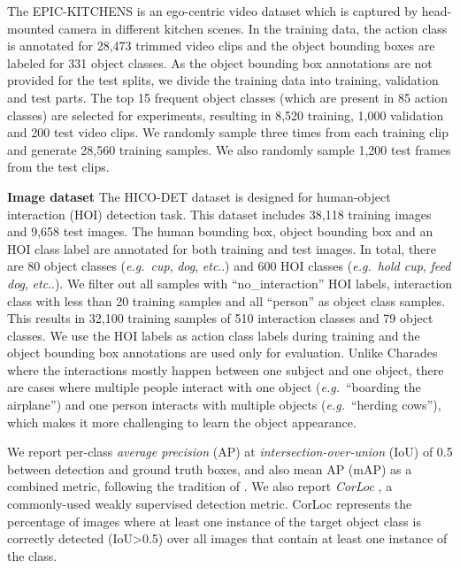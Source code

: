 \documentclass[10pt,twocolumn,letterpaper]{article}
\makeatletter
\DeclareRobustCommand\onedot{\futurelet\@let@token\@onedot}
\def\onedot{\ifx\@let@token.\else.\null\fi\xspace}
\def\eg{\emph{e.g.}}
\def\etc{\emph{etc}\onedot}
\makeatother
\begin{document}
The EPIC-KITCHENS \cite{Damen2018EPICKITCHENS} is an ego-centric video dataset which is captured by head-mounted camera in different kitchen scenes. In the training data, the action class is annotated for 28,473 trimmed video clips and the object bounding boxes are labeled for 331 object classes. As the object bounding box annotations are not provided for the test splits, we divide the training data into training, validation and test parts. The top 15 frequent object classes (which are present in 85 action classes) are selected for experiments, resulting in 8,520 training, 1,000 validation and 200 test video clips. We randomly sample three times from each training clip and generate 28,560 training samples. We also randomly sample 1,200 test frames from the test clips.



\textbf{Image dataset} The HICO-DET dataset \cite{chao2018learning} is designed for human-object interaction (HOI) detection task. This dataset includes 38,118 training images and 9,658 test images. The human bounding box, object bounding box and an HOI class label are annotated for both training and test images. In total, there are 80 object classes (\eg~\textit{cup}, \textit{dog}, \etc) and 600 HOI classes (\eg~\textit{hold cup}, \textit{feed dog}, \etc).  We filter out all samples with ``no\_interaction'' HOI labels, interaction class with less than 20 training samples and all ``person'' as object class samples. This results in 32,100 training samples of 510 interaction classes and 79 object classes. We use the HOI labels as action class labels during training and the object bounding box annotations are used only for evaluation. Unlike Charades where the interactions mostly happen between one subject and one object, there are cases where multiple people interact with one object (\eg~``boarding the airplane'') and one person interacts with multiple objects (\eg~``herding cows''), which makes it more challenging to learn the object appearance.

We report per-class \textit{average precision} (AP) at \textit{intersection-over-union} (IoU) of 0.5 between detection and ground truth boxes, and also mean AP (mAP) as a combined metric, following the tradition of \cite{yuan2017temporal}. We also report \textit{CorLoc} \cite{deselaers2012weakly}, a commonly-used weakly supervised detection metric. CorLoc represents the percentage of images where at least one instance of the target object class is correctly detected (IoU\textgreater0.5) over all images that contain at least one instance of the class.
\end{document}
